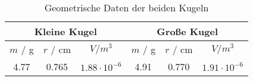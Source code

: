 \begin{table}[!htp]
\centering
\caption{Geometrische Daten der beiden Kugeln}
\label{tab:Kugeln}
\begin{tabular}{c c c c c c}
\toprule
\multicolumn{3}{c}{Kleine Kugel} & \multicolumn{3}{c}{Große Kugel} \\
\midrule
{$m$ / g} & {$r$ / cm} & {$V / m^3$ } & {$m$ / g} & {$r$ / cm} & {$V / m^3$ } \\
4.77 & 0.765 & $1.88 \cdot 10^{-6}$ & 4.91 & 0.770 & $1.91 \cdot 10^{-6}$ \\
\bottomrule
\end{tabular}
\end{table}